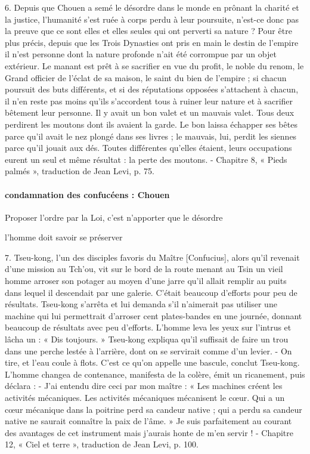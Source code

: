     
  \begin{singlequote}
      6. Depuis que Chouen a semé le désordre dans le monde en prônant la charité et la justice,  l’humanité s’est ruée à corps perdu à leur poursuite, n’est-ce donc pas la preuve que ce sont elles et elles seules qui ont perverti sa nature ? Pour être plus précis, depuis que les Trois Dynasties ont pris en main le destin de l’empire il n’est personne dont la nature profonde n’ait été corrompue par un objet extérieur. Le manant est prêt à se sacrifier en vue du profit, le noble du renom, le Grand officier de l’éclat de sa maison, le saint du bien de l’empire ; si chacun poursuit des buts différents, et si des réputations opposées s’attachent à chacun, il n’en reste pas moins qu’ils s’accordent tous à ruiner leur nature et à sacrifier bêtement leur personne.          Il y avait un bon valet et un mauvais valet. Tous deux perdirent les moutons dont ils avaient la garde. Le bon laissa échapper ses bêtes parce qu’il avait le nez plongé dans ses livres ; le mauvais, lui, perdit les siennes parce qu’il jouait aux dés. Toutes différentes qu’elles étaient, leurs occupations eurent un seul et même résultat : la perte des moutons.   
      - Chapitre 8, « Pieds palmés », traduction de Jean Levi, p. 75.  
  \end{singlequote}
      \paragraph{condamnation des confucéens : Chouen} Proposer l'ordre par la Loi, c'est n'apporter que le désordre

      l'homme doit savoir se préserver
    
  \begin{singlequote}
      7. Tseu-kong, l’un des disciples favoris du Maître [Confucius], alors qu’il revenait d’une  mission au Tch’ou, vit sur le bord de la route menant au Tsin un vieil homme arroser son potager au moyen d’une jarre qu’il allait remplir au puits dans lequel il descendait par une galerie. C’était beaucoup d’efforts pour peu de résultats.          Tseu-kong s’arrêta et lui demanda s’il n’aimerait pas utiliser une machine qui lui permettrait d’arroser cent plates-bandes en une journée, donnant beaucoup de résultats avec peu d’efforts. L’homme leva les yeux sur l’intrus et lâcha un : « Dis toujours. »         Tseu-kong expliqua qu’il suffisait de faire un trou dans une perche lestée à l’arrière, dont on se servirait comme d’un levier.  - On tire, et l’eau coule à flots. C’est ce qu’on appelle une bascule, conclut Tseu-kong.         L’homme changea de contenance, manifesta de la colère, émit un ricanement, puis déclara : - J’ai entendu dire ceci par mon maître : « Les machines créent les activités mécaniques.  Les activités mécaniques mécanisent le cœur. Qui a un cœur mécanique dans la poitrine perd sa candeur native ; qui a perdu sa candeur native ne saurait connaître la paix de l’âme. » Je suis parfaitement au courant des avantages de cet instrument mais j’aurais honte de m’en servir !  - Chapitre 12, « Ciel et terre », traduction de Jean Levi, p. 100.
  \end{singlequote}


